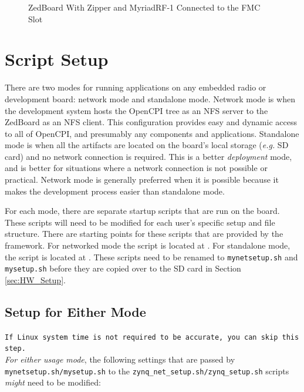 \begin{flushleft}
\begin{figure}[ht]
	\caption{ZedBoard With Zipper and MyriadRF-1 Connected to the FMC Slot}
	\label{fig:zed_zipper}
\end{figure}
\end{flushleft}

\section{Script Setup}
There are two modes for running applications on any embedded radio or development board: network mode and standalone mode.  Network mode is when the development system hosts the OpenCPI tree as an NFS server to the ZedBoard as an NFS client.  This configuration provides easy and dynamic access to all of OpenCPI, and presumably any components and applications.  Standalone mode is when all the artifacts are located on the board's local storage (\textit{e.g.} SD card) and no network connection is required.  This is a better \textit{deployment} mode, and is better for situations where a network connection is not possible or practical.  Network mode is generally preferred when it is possible because it makes the development process easier than standalone mode.

\begin{flushleft}
For each mode, there are separate startup scripts that are run on the board. These scripts will need to be modified for each user's specific setup and file structure.  There are starting points for these scripts that are provided by the framework.  For networked mode the script is located at .  For standalone mode, the script is located at .  These scripts need to be renamed to \texttt{mynetsetup.sh} and \texttt{mysetup.sh} before they are copied over to the SD card in Section \ref{sec:HW_Setup}. \\ \bigskip

\subsection{Setup for Either Mode}
\texttt{If Linux system time is not required to be accurate, you can skip this step.} \\
\medskip \medskip
\textit{For either usage mode}, the following settings that are passed by \texttt{mynetsetup.sh/mysetup.sh} to the \texttt{zynq\_net\_setup.sh/zynq\_setup.sh} scripts \textit{might} need to be modified:
\end{flushleft}

